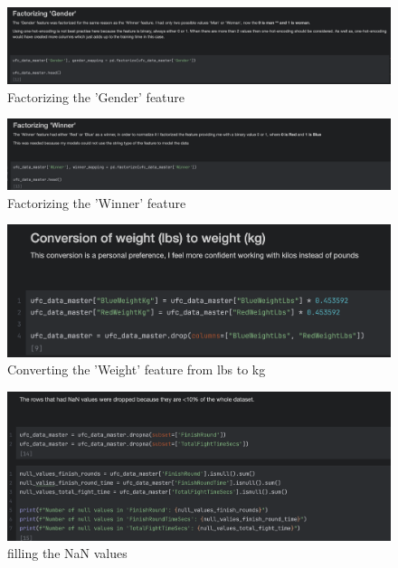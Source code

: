 \documentclass{article}
\begin{document}
  \begin{figure}
    \centering
    \includegraphics[width=1\textwidth]{images/Factorizing_Gender.png}
    \caption{Factorizing the 'Gender' feature}
    \label{fig:factorizing_gender}
  \end{figure}

  \begin{figure}
    \centering
    \includegraphics[width=1\textwidth]{images/Factorizing_Winner.png}
    \caption{Factorizing the 'Winner' feature}
    \label{fig:factorizing_winner}
  \end{figure}

  \begin{figure}
    \centering
    \includegraphics[width=1\textwidth]{images/Conversion_weight_lbs_to_kg.png}
    \caption{Converting the 'Weight' feature from lbs to kg}
    \label{fig:converting_weight}
  \end{figure}

  \begin{figure}
    \centering
    \includegraphics[width=1\textwidth]{images/Filling_NaN_Values.png}
    \caption{filling the NaN values}
    \label{fig:filling_nan_values}
  \end{figure}
\end{document}
